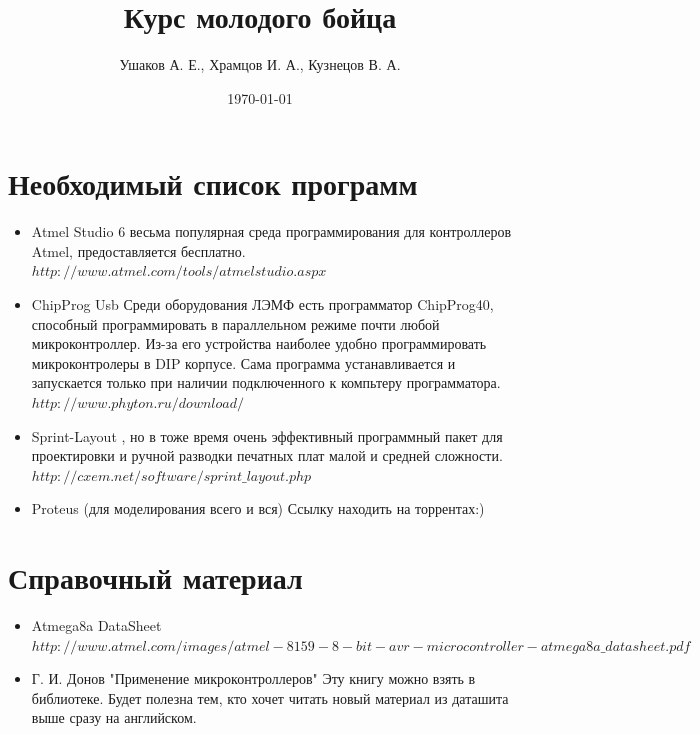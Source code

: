 \documentclass[12pt]{article}
\title{Курс молодого бойца}
\author{Ушаков А. Е., Храмцов И. А., Кузнецов В. А.}
\date{\today}
\begin{document}
\maketitle


\newpage
\tableofcontents
\newpage
\section{Необходимый список программ}
\begin{itemize}
\item Atmel Studio 6
 весьма популярная среда программирования для контроллеров Atmel, предоставляется бесплатно.
\newline $http://www.atmel.com/tools/atmelstudio.aspx$
\item ChipProg Usb
\newline Среди оборудования ЛЭМФ есть программатор ChipProg40, способный программировать в параллельном режиме почти любой микроконтроллер. Из-за его устройства наиболее удобно программировать микроконтролеры в DIP корпусе. Сама программа устанавливается и запускается только при наличии подключенного к компьтеру программатора.
\newline $http://www.phyton.ru/download/$
\item Sprint-Layout
, но в тоже время очень эффективный программный пакет для проектировки и ручной разводки печатных плат малой и средней сложности.
\newline $http://cxem.net/software/sprint\_layout.php$
\item Proteus (для моделирования всего и вся) Ссылку находить на торрентах:)
\end{itemize}
\section{Справочный материал}
\begin{itemize}
\item Atmega8a DataSheet 
\newline $http://www.atmel.com/images/atmel-8159-8-bit-avr-microcontroller-atmega8a\_datasheet.pdf$
\item Г. И. Донов "Применение микроконтроллеров"
\newline Эту книгу можно взять в библиотеке. Будет полезна тем, кто хочет читать новый материал из даташита выше сразу на английском.
\end{itemize}
\end{document}

